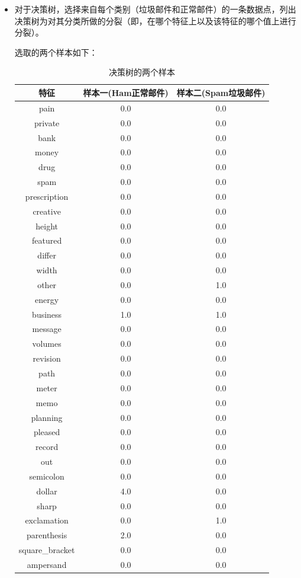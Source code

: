 \documentclass[8pt]{article}
\begin{document}
\begin{itemize}
\item
对于决策树，选择来自每个类别（垃圾邮件和正常邮件）的一条数据点，列出决策树为对其分类所做的分裂（即，在哪个特征上以及该特征的哪个值上进行分裂）。

选取的两个样本如下：
\begin{table}[H]
    \centering
    \caption{决策树的两个样本}
    \label{tab:决策树样本}
    \begin{tabular}{c|c|c}
        \toprule
        特征 & 样本一(Ham正常邮件) & 样本二(Spam垃圾邮件) \\
        \midrule
        pain & 0.0 & 0.0 \\
        private & 0.0 & 0.0 \\
        bank & 0.0 & 0.0 \\
        money & 0.0 & 0.0 \\
        drug & 0.0 & 0.0 \\
        spam & 0.0 & 0.0 \\
        prescription & 0.0 & 0.0 \\
        creative & 0.0 & 0.0 \\
        height & 0.0 & 0.0 \\
        featured & 0.0 & 0.0 \\
        differ & 0.0 & 0.0 \\
        width & 0.0 & 0.0 \\
        other & 0.0 & 1.0 \\
        energy & 0.0 & 0.0 \\
        business & 1.0 & 1.0 \\
        message & 0.0 & 0.0 \\
        volumes & 0.0 & 0.0 \\
        revision & 0.0 & 0.0 \\
        path & 0.0 & 0.0 \\
        meter & 0.0 & 0.0 \\
        memo & 0.0 & 0.0 \\
        planning & 0.0 & 0.0 \\
        pleased & 0.0 & 0.0 \\
        record & 0.0 & 0.0 \\
        out & 0.0 & 0.0 \\
        semicolon & 0.0 & 0.0 \\
        dollar & 4.0 & 0.0 \\
        sharp & 0.0 & 0.0 \\
        exclamation & 0.0 & 1.0 \\
        parenthesis & 2.0 & 0.0 \\
        square\_bracket & 0.0 & 0.0 \\
        ampersand & 0.0 & 0.0 \\
        \bottomrule
    \end{tabular}
\end{table}


\end{itemize}
\end{document}
